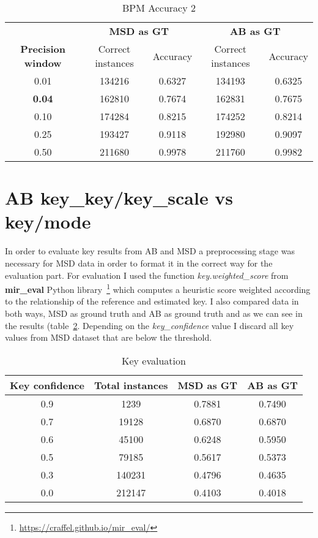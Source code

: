 \documentclass[a4paper]{article}
\begin{document}
\begin{table}[ht!]
\centering
\begin{tabular}{ccccc}

 & \multicolumn{2}{c}{\textbf{MSD as GT}} & \multicolumn{2}{c}{\textbf{AB as GT}}  \\ \cline{2-5}
\textbf{Precision window}& Correct instances & Accuracy & Correct instances & Accuracy \\ \hline
0.01& 134216 & 0.6327 & 134193 & 0.6325 \\ 
\textbf{0.04}& 162810 & 0.7674 & 162831 & 0.7675 \\ 
0.10& 174284 & 0.8215 & 174252 & 0.8214 \\ 
0.25& 193427 & 0.9118 & 192980 & 0.9097 \\ 
0.50& 211680 & 0.9978 & 211760 & 0.9982 \\ \hline
\end{tabular}
\caption{BPM Accuracy 2}
\label{tab:BPM2}
\end{table}

\section{AB key\_key/key\_scale vs key/mode}
In order to evaluate key results from AB and MSD a preprocessing stage was necessary for MSD data in order to format it in the correct way for the evaluation part. For evaluation I used the function \textit{key.weighted\_score} from \textbf{mir\_eval} Python library~\footnote{\url{https://craffel.github.io/mir_eval/}} which computes a heuristic score weighted according to the relationship of the reference and estimated key. I also compared data in both ways, MSD as ground truth and AB as ground truth and as we can see in the results (table~\ref{tab:key}. Depending on the \textit{key\_confidence} value I discard all key values from MSD dataset that are below the threshold.
\begin{table}[ht!]
\centering
\begin{tabular}{cccc}
\textbf{Key confidence} & \textbf{Total instances} & \textbf{MSD as GT} & \textbf{AB as GT}  \\ \hline 
0.9 & 1239 & 0.7881 & 0.7490 \\ 
0.7 & 19128 & 0.6870 & 0.6870 \\
0.6 & 45100 & 0.6248 & 0.5950 \\
0.5 & 79185 & 0.5617 & 0.5373 \\
0.3 & 140231 & 0.4796 & 0.4635 \\ 
0.0 & 212147 & 0.4103 & 0.4018 \\ \hline


\end{tabular}
\caption{Key evaluation}
\label{tab:key}
\end{table}
\end{document}
